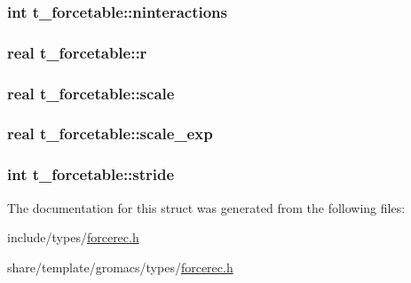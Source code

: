 \hypertarget{structt__forcetable_af6ff5f87d9de25506105000425c5652f}{
\subsubsection[{ninteractions}]{\setlength{\rightskip}{0pt plus 5cm}int {\bf t\-\_\-forcetable\-::ninteractions}}}\label{structt__forcetable_af6ff5f87d9de25506105000425c5652f}
\hypertarget{structt__forcetable_abe799803c1b92fb8bb8007494eb78feb}{
\subsubsection[{r}]{\setlength{\rightskip}{0pt plus 5cm}real {\bf t\-\_\-forcetable\-::r}}}\label{structt__forcetable_abe799803c1b92fb8bb8007494eb78feb}
\hypertarget{structt__forcetable_a74042b613c0660e9d1a66b49147d0159}{
\subsubsection[{scale}]{\setlength{\rightskip}{0pt plus 5cm}real {\bf t\-\_\-forcetable\-::scale}}}\label{structt__forcetable_a74042b613c0660e9d1a66b49147d0159}
\hypertarget{structt__forcetable_a93b8ebe429ad3ec762545c70113fcbc5}{
\subsubsection[{scale\-\_\-exp}]{\setlength{\rightskip}{0pt plus 5cm}real {\bf t\-\_\-forcetable\-::scale\-\_\-exp}}}\label{structt__forcetable_a93b8ebe429ad3ec762545c70113fcbc5}
\hypertarget{structt__forcetable_a9432ad1dc64a5126fe8c9f18ac4de9b2}{
\subsubsection[{stride}]{\setlength{\rightskip}{0pt plus 5cm}int {\bf t\-\_\-forcetable\-::stride}}}\label{structt__forcetable_a9432ad1dc64a5126fe8c9f18ac4de9b2}


\-The documentation for this struct was generated from the following files\-:\begin{DoxyCompactItemize}
\item 
include/types/\hyperlink{include_2types_2forcerec_8h}{forcerec.\-h}\item 
share/template/gromacs/types/\hyperlink{share_2template_2gromacs_2types_2forcerec_8h}{forcerec.\-h}\end{DoxyCompactItemize}
